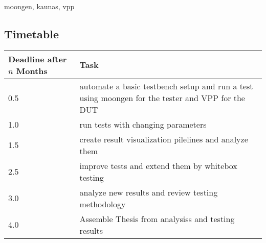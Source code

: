 \documentclass[NET,a4,12pt,ngerman]{netforms}
\begin{document}
moongen, kaunas, vpp

\subsection*{Timetable}

\begin{tabular}{|l|p{10cm}|}
\hline
Deadline after $n$ Months & Task \\ \hline
0.5 & automate a basic testbench setup and run a test using moongen for
the tester and VPP for the DUT \\ \hline
1.0 & run tests with changing parameters \\ \hline
1.5 & create result visualization pilelines and analyze them \\ \hline
2.5 & improve tests and extend them by whitebox testing \\ \hline
3.0 & analyze new results and review testing methodology \\ \hline
4.0 & Assemble Thesis from analysiss and testing results \\ \hline
\end{tabular}



\end{document}
